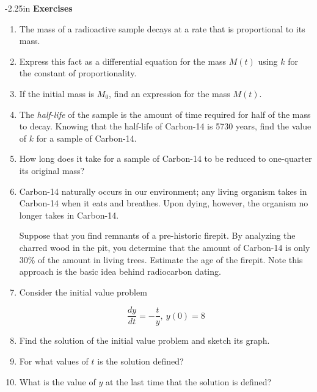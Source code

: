 \begin{adjustwidth*}{}{-2.25in}
\textbf{{\large Exercises}}
\setlength{\columnsep}{25pt}
\begin{multicols*}{2}

 \small

\begin{enumerate}[1)]
\item  The mass of a radioactive sample decays at a rate that is
    proportional to its mass. 
    \ba
  \item Express this fact as a differential equation for the mass
    $M(t)$ using $k$ for the constant of proportionality.
    \item If the initial mass is $M_0$, find an expression for the
      mass $M(t)$.
    \item The {\em half-life} of the sample is the amount of time
      required for half of the mass to decay.  Knowing that the
      half-life of Carbon-14 is 5730 years, find the value of $k$ for
      a sample of Carbon-14.
    \item How long does it take for a sample of Carbon-14 to be
      reduced to one-quarter its original mass?
    \item Carbon-14 naturally occurs in our environment; any
      living organism takes in Carbon-14 when it eats and breathes.  Upon
      dying, however, the organism no longer takes in Carbon-14. 
      
      Suppose that you find remnants of a pre-historic firepit.  By
      analyzing the charred wood in the pit, you determine that the
      amount of Carbon-14 is only 30\% of the amount in living trees.
      Estimate the age of the firepit.  Note this approach is the basic idea behind radiocarbon dating.

      
    \ea

  \item Consider the initial value problem
    
    $$  \frac{dy}{dt} = -\frac ty, \ y(0) = 8$$
    

    \ba
    \item Find the solution of the initial value problem and sketch its
      graph.

    \item For what values of $t$ is the solution defined?  

    \item What is the value of $y$ at the last time that the
      solution is defined? 


\end{enumerate}
\end{multicols*}
\end{adjustwidth*}
